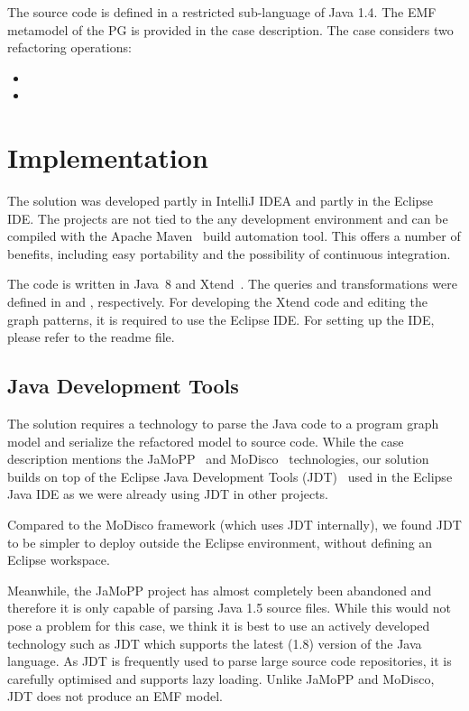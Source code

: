 \documentclass[submission,copyright,creativecommons]{eptcs}
\begin{document}
The source code is defined in a restricted sub-language of Java 1.4. The EMF metamodel of the PG is provided in the case description. The case considers two refactoring operations:

\begin{itemize}[noitemsep]
\item {}
\item {}
\end{itemize}

\section{Implementation}

The solution was developed partly in IntelliJ IDEA and partly in the Eclipse IDE. The projects are not tied to the any development environment and can be compiled with the Apache Maven~\cite{Maven} build automation tool. This offers a number of benefits, including easy portability and the possibility of continuous integration.

The code is written in Java~8 and Xtend~\cite{Xtend}. The queries and transformations were defined in \eiq and \viatra, respectively. For developing the Xtend code and editing the graph patterns, it is required to use the Eclipse IDE. For setting up the IDE, please refer to the readme file. 

\subsection{Java Development Tools}

The solution requires a technology to parse the Java code to a program graph model and serialize the refactored model to source code. While the case description mentions the JaMoPP~\cite{JaMoPP} and MoDisco~\cite{MoDisco} technologies, our solution builds on top of the Eclipse Java Development Tools (JDT)~\cite{jdt} used in the Eclipse Java IDE as we were already using JDT in other projects.

Compared to the MoDisco framework (which uses JDT internally), we found JDT to be simpler to deploy outside the Eclipse environment, \ie without defining an Eclipse workspace.

Meanwhile, the JaMoPP project has almost completely been abandoned and therefore it is only capable of parsing Java 1.5 source files. While this would not pose a problem for this case, we think it is best to use an actively developed technology such as JDT which supports the latest (1.8) version of the Java language. As JDT is frequently used to parse large source code repositories, it is carefully optimised and supports lazy loading. Unlike JaMoPP and MoDisco, JDT does not produce an EMF model.
\end{document}
